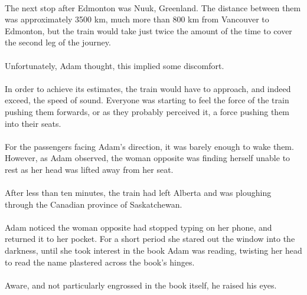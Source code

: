 \documentclass{article}
\begin{document}
\paragraph{}
The next stop after Edmonton was Nuuk, Greenland. The distance between them was approximately 3500 km, much more than 800 km from Vancouver to Edmonton, but the train would take just twice the amount of the time to cover the second leg of the journey.

\paragraph{}
Unfortunately, Adam thought, this implied some discomfort.

\paragraph{}
In order to achieve its estimates, the train would have to approach, and indeed exceed, the speed of sound. Everyone was starting to feel the force of the train pushing them forwards, or as they probably perceived it, a force pushing them into their seats.

\paragraph{}
For the passengers facing Adam's direction, it was barely enough to wake them. However, as Adam observed, the woman opposite was finding herself unable to rest as her head was lifted away from her seat.

\paragraph{}
After less than ten minutes, the train had left Alberta and was ploughing through the Canadian province of Saskatchewan.

\paragraph{}
Adam noticed the woman opposite had stopped typing on her phone, and returned it to her pocket. For a short period she stared out the window into the darkness, until she took interest in the book Adam was reading, twisting her head to read the name plastered across the book's hinges.

\paragraph{}
Aware, and not particularly engrossed in the book itself, he raised his eyes.
\end{document}
